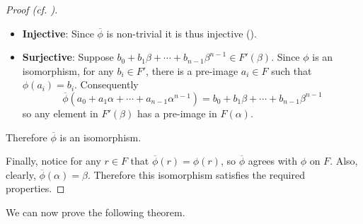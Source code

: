 \begin{proof}[Proof (cf. {\cite[Lemma 21.32]{judson_beezer_2022}})]
\begin{itemize}
        \item \textbf{Injective}: Since $\overline{\phi}$ is non-trivial it is thus injective ().

        \item \textbf{Surjective}: Suppose $b_0 + b_1\beta + \cdots + b_{n-1}\beta^{n-1} \in F'(\beta)$. Since $\phi$ is an isomorphism, for any $b_i \in F'$, there is a pre-image $a_i \in F$ such that $\phi(a_i) = b_i$. Consequently
        \[
            \overline{\phi}\left(a_0 + a_1\alpha + \cdots + a_{n-1}\alpha^{n-1}\right) = b_0 + b_1\beta + \cdots + b_{n-1}\beta^{n-1}
        \]
        so any element in $F'(\beta)$ has a pre-image in $F(\alpha)$.
    \end{itemize}
    Therefore $\overline{\phi}$ is an isomorphism.

    Finally, notice for any $r \in F$ that $\overline{\phi}(r) = \phi(r)$, so $\overline{\phi}$ agrees with $\phi$ on $F$. Also, clearly, $\overline{\phi}(\alpha) = \beta$. Therefore this isomorphism satisfies the required properties.
\end{proof}

We can now prove the following theorem.

